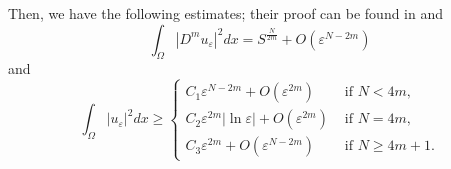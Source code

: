 \documentclass[reqno]{amsart}
\newcommand{\DD} {\displaystyle}
\newcommand{\eps}{\varepsilon}
\newcommand{\Om}{\Omega}
\newcommand{\noi} {  \noindent}
\newcommand{\mb} {\mathbb}
\numberwithin{theorem}{section} \numberwithin{equation}{section}
\begin{document}
\noi Then, we have the following estimates; their proof can be found in  \cite[Lemma 4.3]{22shang2014multiple} and \cite[Lemma 2] {25grunau1995positive}
\begin{equation} \label{e11}
\DD\int_{\Om}\left|D^m u_{\eps}\right|^2 dx = S^{\frac{N}{2m}}+O\left(\eps^{N-2m}\right)
\end{equation}
\noi and
\begin{equation} \label{e54}
\DD\int_\Om|u_\eps|^2dx \geq \begin{cases} C_1 \eps^{N-2m} + O(\eps^{2m})& \text { if } N<4m,\\
 C_2 \eps^{2m}|\ln \eps|+O(\eps^{2m}) & \text { if } N=4m, \\
C_3 \eps^{2m} + O(\eps^{N-2m})& \text { if } N\geq4m+1. \end{cases}
\end{equation}\

\end{document}
